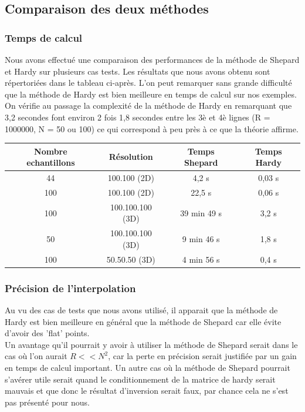 \documentclass[a4paper,9pt]{article}
\begin{document}
\clearpage
\newpage

\subsection{Comparaison des deux méthodes}
\label{subsec:comparaison_methodes}

\subsubsection{Temps de calcul}
\label{subsec:temps_calcul}
Nous avons effectué une comparaison des performances de la méthode de Shepard et Hardy sur plusieurs cas tests. Les résultats que nous avons obtenu sont répertoriées dans le tableau ci-après. L'on peut remarquer sans grande difficulté que la méthode de Hardy est bien meilleure en temps de calcul sur nos exemples. \\On vérifie au passage la complexité de la méthode de Hardy en remarquant que 3,2 secondes font environ 2 fois 1,8 secondes entre les 3è et 4è lignes (R = 1000000, N = 50 ou 100) ce qui correspond à peu près à ce que la théorie affirme.\\
 
\begin{tabular}{|c|c|c|c|}
\hline
Nombre echantillons & Résolution & Temps Shepard & Temps Hardy \\
\hline
44 & 100.100 (2D) & 4,2 s & 0,03 s \\
100 & 100.100 (2D) & 22,5 s & 0,06 s \\
100 & 100.100.100 (3D) & 39 min 49 s & 3,2 s \\
50 & 100.100.100 (3D) & 9 min 46 s & 1,8 s \\
100 & 50.50.50 (3D) & 4 min 56 s & 0,4 s \\
\hline
\end{tabular}

\subsubsection{Précision de l'interpolation}
\label{subsec:precision_interpolation}
Au vu des cas de tests que nous avons utilisé, il apparait que la méthode de Hardy est bien meilleure en général que la méthode de Shepard car elle évite d'avoir des 'flat' points. \\Un avantage qu'il pourrait y avoir à utiliser la méthode de Shepard serait dans le cas où l'on aurait $R<<N^{2}$, car la perte en précision serait justifiée par un gain en temps de calcul important. Un autre cas où la méthode de Shepard pourrait s'avérer utile serait quand le conditionnement de la matrice de hardy serait mauvais et que donc le résultat d'inversion serait faux, par chance cela ne s'est pas présenté pour nous.\\\\
\end{document}
